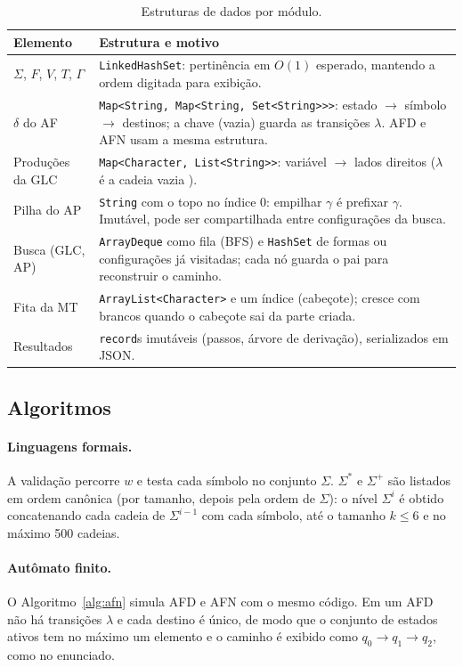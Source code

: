\documentclass[12pt,a4paper]{article}
\newcommand{\cod}[1]{\texttt{#1}}
\newcommand{\lam}{\lambda}
\begin{document}
\begin{table}[htbp]
  \centering
  \caption{Estruturas de dados por módulo.}
  \label{tab:estruturas}
  \small
  \begin{tabularx}{\textwidth}{lX}
    \toprule
    Elemento & Estrutura e motivo \\
    \midrule
    $\Sigma$, $F$, $V$, $T$, $\Gamma$ & \cod{LinkedHashSet}: pertinência em $O(1)$ esperado, mantendo a ordem digitada para exibição. \\
    $\delta$ do AF & \cod{Map<String, Map<String, Set<String>>>}: estado $\to$ símbolo $\to$ destinos; a chave \cod{\textquotedbl\textquotedbl} (vazia) guarda as transições $\lam$. AFD e AFN usam a mesma estrutura. \\
    Produções da GLC & \cod{Map<Character, List<String>>}: variável $\to$ lados direitos ($\lam$ é a cadeia vazia \cod{\textquotedbl\textquotedbl}). \\
    Pilha do AP & \cod{String} com o topo no índice 0: empilhar $\gamma$ é prefixar $\gamma$. Imutável, pode ser compartilhada entre configurações da busca. \\
    Busca (GLC, AP) & \cod{ArrayDeque} como fila (BFS) e \cod{HashSet} de formas ou configurações já visitadas; cada nó guarda o pai para reconstruir o caminho. \\
    Fita da MT & \cod{ArrayList<Character>} e um índice (cabeçote); cresce com brancos quando o cabeçote sai da parte criada. \\
    Resultados & \cod{record}s imutáveis (passos, árvore de derivação), serializados em JSON. \\
    \bottomrule
  \end{tabularx}
\end{table}

\subsection{Algoritmos}

\paragraph{Linguagens formais.} A validação percorre $w$ e testa cada símbolo
no conjunto $\Sigma$. $\Sigma^*$ e $\Sigma^+$ são listados em ordem canônica
(por tamanho, depois pela ordem de $\Sigma$): o nível $\Sigma^i$ é obtido
concatenando cada cadeia de $\Sigma^{i-1}$ com cada símbolo, até o tamanho
$k \le 6$ e no máximo 500 cadeias.

\paragraph{Autômato finito.} O Algoritmo~\ref{alg:afn} simula AFD e AFN com o
mesmo código. Em um AFD não há transições $\lam$ e cada destino é único, de
modo que o conjunto de estados ativos tem no máximo um elemento e o caminho é
exibido como $q_0 \to q_1 \to q_2$, como no enunciado.
\end{document}
